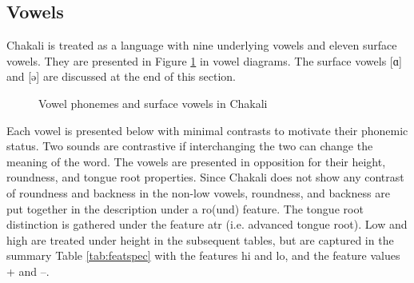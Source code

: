 
\subsection{Vowels}
\label{sec:vowels}

Chakali is treated as a language with nine underlying vowels and eleven
surface vowels. They
are presented in Figure \ref{fig:Phon-phon-srf} in  vowel diagrams.  The 
surface vowels [ɑ] and  [ə] are discussed  at the end of this section. 


\begin{figure}


\qquad
{}

\caption{Vowel phonemes and surface vowels in Chakali \label{fig:Phon-phon-srf}}
\end{figure}


Each vowel is presented below with minimal contrasts to motivate their phonemic
status.   Two sounds are contrastive if interchanging the two can change the
meaning of the word. The vowels are presented in opposition for their height,
roundness,  and tongue root properties. Since Chakali does not show any
contrast of roundness and backness in the non-low vowels, roundness, and 
backness   are put together in the description under a {\sc ro}(und) feature. The tongue root distinction is gathered under the feature {\sc atr} (i.e. advanced
tongue root). Low and high are treated under {\sc height} in the
subsequent tables, but are captured in the summary Table \ref{tab:featspec}
with the features {\sc hi}   and {\sc lo},  and the feature values +
and --. 



